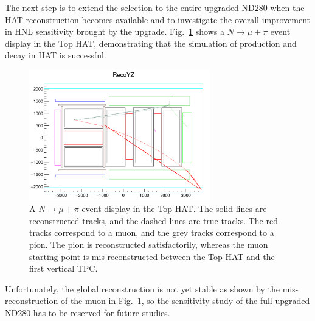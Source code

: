         The next step is to extend the selection to the entire upgraded ND280 when the HAT reconstruction becomes available and to investigate the overall improvement in HNL sensitivity brought by the upgrade.
        Fig.~\ref{fig:hnl-hatevedis} shows a $N\rightarrow\mu+\pi$ event display in the Top HAT, demonstrating that the simulation of production and decay in HAT is successful. 
        \begin{figure}[!ht] 
            \centering 		
            \includegraphics[width=0.7\textwidth]{figures/hnl/HATevedis.png}
            \caption{\label{fig:hnl-hatevedis} A $N\rightarrow\mu+\pi$ event display in the Top HAT.
            The solid lines are reconstructed tracks, and the dashed lines are true tracks.
            The red tracks correspond to a muon, and the grey tracks correspond to a pion.
            The pion is reconstructed satisfactorily, whereas the muon starting point is mis-reconstructed between the Top HAT and the first vertical TPC.
            }
        \end{figure}
        Unfortunately, the global reconstruction is not yet stable as shown by the mis-reconstruction of the muon in Fig.~\ref{fig:hnl-hatevedis}, so the sensitivity study of the full upgraded ND280 has to be reserved for future studies.

